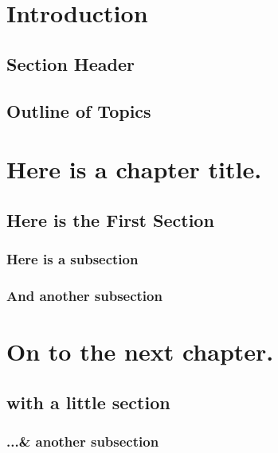 \documentclass[crownvopaper,
               extrafontsizes,
               11pt,
               twoside,
               openright,
               final]{memoir}
\begin{document}
\pagestyle{myheadings}

\tableofcontents
\newpage

 \chapter*{Introduction}
 \lipsum[1]

 \section*{Section Header}
 \lipsum[2-3]

 \section*{Outline of Topics}
 \lipsum[4-6]

 \chapter{Here is a chapter title.}
 \section{Here is the First Section}
 \lipsum[1]
 \subsection{Here is a subsection}
 \lipsum[2-4]
 \subsection{And another subsection}
 \lipsum[5-6]
 \chapter{On to the next chapter.}
 \lipsum[7]
 \section{with a little section}
 \lipsum[8-9]
 \subsection{...\& another subsection}
 \lipsum[10]
\end{document}
